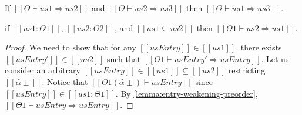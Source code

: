 \begin{corollary} 
    \label{lemma:weakening-transitivity}
    If $[[Θ ⊢ us1 ⇒ us2]]$ and $[[Θ ⊢ us2 ⇒ us3]]$ then $[[Θ ⊢ us1 ⇒ us3]]$.
\end{corollary}

\begin{lemma} 
    \label{lemma:weakening-monotonicity}
    if $[[us1 : Θ1]]$, $[[us2 : Θ2]]$,
    and $[[us1 ⊆ us2]]$ then $[[Θ1 ⊢ us2 ⇒ us1]]$.
\end{lemma}
\begin{proof}
    We need to show that for any $[[usEntry]] \in [[us1]]$,
    there exists $[[usEntry']] \in [[us2]]$ such that 
    $[[Θ1 ⊢ usEntry' ⇒ usEntry]]$.
    Let us consider an arbitrary $[[usEntry]] \in [[us1]] \subseteq [[us2]]$
    restricting $[[α̂±]]$. 
    Notice that $[[Θ1(α̂±) ⊢ usEntry ]]$ since 
    $[[usEntry]] \in [[us1 : Θ1]]$.
    By \cref{lemma:entry-weakening-preorder}, $[[Θ1 ⊢ usEntry ⇒ usEntry]]$. 
\end{proof}

